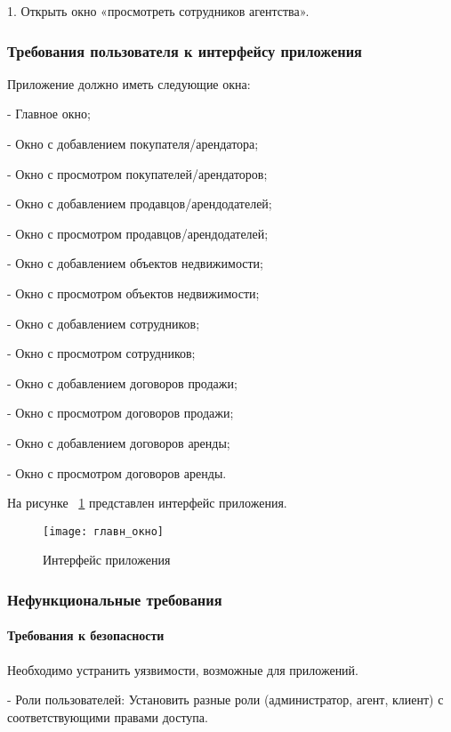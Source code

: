 1.	Открыть окно «просмотреть сотрудников агентства».


\subsubsection{Требования пользователя к интерфейсу приложения}

Приложение должно иметь следующие окна:

-	Главное окно;

-	Окно с добавлением покупателя/арендатора;

-	Окно с просмотром покупателей/арендаторов;

-	Окно с добавлением продавцов/арендодателей;

-	Окно с просмотром продавцов/арендодателей;

-	Окно с добавлением объектов недвижимости;

-	Окно с просмотром объектов недвижимости;

-	Окно с добавлением сотрудников;

-	Окно с просмотром сотрудников;

-	Окно с добавлением договоров продажи;

-	Окно с просмотром договоров продажи;

-	Окно с добавлением договоров аренды;

-	Окно с просмотром договоров аренды.

\clearpage

На рисунке ~\ref{gl_okno:image} представлен интерфейс приложения.

\begin{figure}[H]
	\texttt{[image: главн\_окно]}
	\caption{Интерфейс приложения}
	\label{gl_okno:image}
\end{figure}


\subsubsection{Нефункциональные требования}

\paragraph{Требования к безопасности}

Необходимо устранить уязвимости, возможные для приложений.

- Роли пользователей: Установить разные роли (администратор, агент, клиент) с соответствующими правами доступа.

